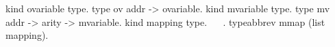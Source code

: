   kind ovariable type.
  type ov addr -> ovariable.
  kind mvariable type.
  type mv addr -> arity -> mvariable.
  kind mapping type.
  ~  ~.
  typeabbrev mmap (list mapping).
